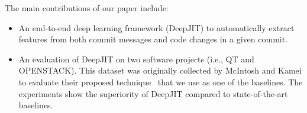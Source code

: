 The main contributions of our paper include:
\begin{itemize}
    \item An end-to-end deep learning framework (DeepJIT) to automatically extract features from both commit messages and code changes in a given commit. 
    \item An evaluation of DeepJIT on two software projects (i.e., QT and OPENSTACK). This dataset was originally collected by McIntosh and Kamei to evaluate their proposed technique~\cite{mcintosh2018fix} that we use as one of the baselines. The  experiments show the  superiority of DeepJIT compared to state-of-the-art baselines.
\end{itemize}
